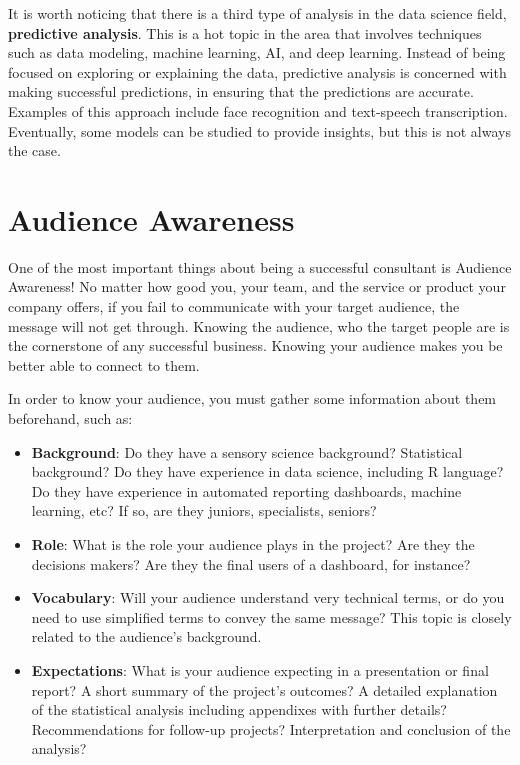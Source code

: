 \documentclass[
]{krantz}
\providecommand{\tightlist}{%
  \setlength{\itemsep}{0pt}\setlength{\parskip}{0pt}}
\begin{document}
It is worth noticing that there is a third type of analysis in the data science field, \textbf{predictive analysis}. This is a hot topic in the area that involves techniques such as data modeling, machine learning, AI, and deep learning. Instead of being focused on exploring or explaining the data, predictive analysis is concerned with making successful predictions, in ensuring that the predictions are accurate. Examples of this approach include face recognition and text-speech transcription. Eventually, some models can be studied to provide insights, but this is not always the case.

\hypertarget{audience-awareness}{%
\section{Audience Awareness}\label{audience-awareness}}

One of the most important things about being a successful consultant is Audience Awareness! No matter how good you, your team, and the service or product your company offers, if you fail to communicate with your target audience, the message will not get through. Knowing the audience, who the target people are is the cornerstone of any successful business. Knowing your audience makes you be better able to connect to them.

In order to know your audience, you must gather some information about them beforehand, such as:

\begin{itemize}
\tightlist
\item
  \textbf{Background}: Do they have a sensory science background? Statistical background? Do they have experience in data science, including R language? Do they have experience in automated reporting dashboards, machine learning, etc? If so, are they juniors, specialists, seniors?
\item
  \textbf{Role}: What is the role your audience plays in the project? Are they the decisions makers? Are they the final users of a dashboard, for instance?
\item
  \textbf{Vocabulary}: Will your audience understand very technical terms, or do you need to use simplified terms to convey the same message? This topic is closely related to the audience's background.
\item
  \textbf{Expectations}: What is your audience expecting in a presentation or final report? A short summary of the project's outcomes? A detailed explanation of the statistical analysis including appendixes with further details? Recommendations for follow-up projects? Interpretation and conclusion of the analysis?
\end{itemize}
\end{document}
